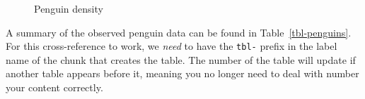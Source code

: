 \documentclass[
]{report}
\begin{document}
\begin{figure}[hb]


\caption{\label{fig-penguin-density}Penguin density}

\end{figure}%

A summary of the observed penguin data can be found in
Table~\ref{tbl-penguins}. For this cross-reference to work, we
\emph{need} to have the \texttt{tbl-} prefix in the label name of the
chunk that creates the table. The number of the table will update if
another table appears before it, meaning you no longer need to deal with
number your content correctly.\\
\end{document}
